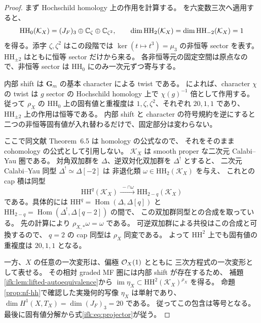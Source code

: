 \begin{proof}
まず Hochschild homology 上の作用を計算する。
\cite[Corollary~5.41]{NFBFKKernels}を六変数三次へ適用すると、
\[
 \mathrm{HH}_0(\mathcal K_X)
     =(J_F)_3\oplus\mathbb C_{\zeta}\oplus\mathbb C_{\zeta^2},
 \qquad
 \dim\mathrm{HH}_{2}(\mathcal K_X)
   =\dim\mathrm{HH}_{-2}(\mathcal K_X)=1
\]
を得る。添字 $\zeta,\zeta^2$ はこの段階では
$\ker(t\mapsto t^3)=\mu_3$ の非恒等 sector を表す。
$\mathrm{HH}_{\pm2}$ はともに恒等 sector だけから来る。
各非恒等元の固定空間は原点なので、非恒等 sector は
$\mathrm{HH}_0$ にのみ一次元ずつ寄与する。

内部 shift は $\mathbf G_m$ の基本 character による twist である。
\cite[Theorem~6.5]{NFBFKKernels}によれば、character $\chi$ の twist は
$g$ sector の Hochschild homology 上で $\chi(g)^{-1}$ 倍として作用する。
従って $\rho_X$ の $\mathrm{HH}_0$ 上の固有値と重複度は
$1,\zeta,\zeta^2$、それぞれ $20,1,1$ であり、
$\mathrm{HH}_{\pm2}$ 上の作用は恒等である。
内部 shift と character の符号規約を逆にすると
二つの非恒等固有値が入れ替わるだけで、固定部分は変わらない。

ここで同文献 Theorem~6.5 は homology の公式なので、
それをそのまま cohomology の公式として引用しない。
$\mathcal K_X$ は smooth proper な二次元 Calabi--Yau 圏である。
対角双加群を $\Delta$、逆双対化双加群を $\Delta^!$ とすると、
二次元 Calabi--Yau 同型 $\Delta^!\simeq\Delta[-2]$ は
非退化類 $\omega\in\mathrm{HH}_2(\mathcal K_X)$ を与え、
これとの cap 積は同型
\[
 \mathrm{HH}^q(\mathcal K_X)
      \xrightarrow{\ -\mathbin{\cap}\omega\ }
 \mathrm{HH}_{2-q}(\mathcal K_X)
\]
である。具体的には
$\mathrm{HH}^q=\operatorname{Hom}(\Delta,\Delta[q])$ と
$\mathrm{HH}_{2-q}=\operatorname{Hom}(\Delta^!,\Delta[q-2])$ の間で、
この双加群同型との合成を取っている。
先の計算により $\rho_{X,*}\omega=\omega$ である。
可逆双加群による共役はこの合成と可換するので、
$q=2$ の cap 同型は $\rho_X$ 同変である。
よって $\mathrm{HH}^2$ 上でも固有値の重複度は $20,1,1$ となる。

一方、$X$ の任意の一次変形は、偏極 $\mathcal O_X(1)$ とともに
三次方程式の一次変形として表せる。
その相対 graded MF 圏には内部 shift が存在するため、
補題\ref{ifk:lem:lifted-autoequivalence}から
$\operatorname{im}\eta_X\subset\mathrm{HH}^2(\mathcal K_X)^{\rho_X}$ を得る。
命題\ref{prop:nf-hh}で確認した実幾何的写像
$\eta_X$ は単射であり、$\dim H^1(X,T_X)=\dim(J_F)_3=20$ である。
従ってこの包含は等号となる。
最後に固有値分解から式\eqref{ifk:eq:projector}が従う。
\end{proof}

